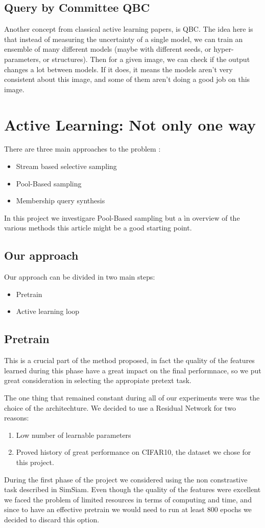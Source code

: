 \documentclass{article}
\begin{document}
\begin{flushleft}
\subsection{Query by Committee QBC}
Another concept from classical active learning papers, is QBC. 
The idea here is that instead of measuring the uncertainty of a single model, 
we can train an ensemble of many different models (maybe with different seeds, 
or hyper-parameters, or structures). Then for a given image, 
we can check if the output changes a lot between models. If it does, 
it means the models aren’t very consistent about this image, 
and some of them aren’t doing a good job on this image.
\section*{Active Learning: Not only one way}
There are three main approaches to the problem :
\begin{itemize}
    \item Stream based selective sampling
    \item Pool-Based sampling
    \item Membership query synthesis
\end{itemize}
In this project we investigare Pool-Based sampling but a ìn overview of the various methods this article might be a good starting point.

\subsection*{Our approach}
Our approach can be divided in two main steps:
\begin{itemize}
    \item Pretrain
    \item Active learning loop
\end{itemize}

\subsection*{Pretrain}
This is a crucial part of the method proposed, in fact the quality of the features learned 
during this phase have a great impact on the final performnace, 
so we put great consideration in selecting the appropiate pretext task.

The one thing that remained constant during all of our experiments 
were was the choice of the architechture. 
We decided to use a Residual Network for two reasons:
\begin{enumerate}
    \item Low number of learnable parameters
    \item Proved history of great performance on CIFAR10, the dataset we chose for this project.
\end{enumerate}
During the first phase of the project we considered using the non constrastive task 
described in SimSiam. Even though the quality of the features were excellent 
we faced the problem of limited resources in terms of computing and time, 
and since to have an effective pretrain we would need to run at least 800 epochs 
we decided to discard this option.
\end{flushleft}
\end{document}
